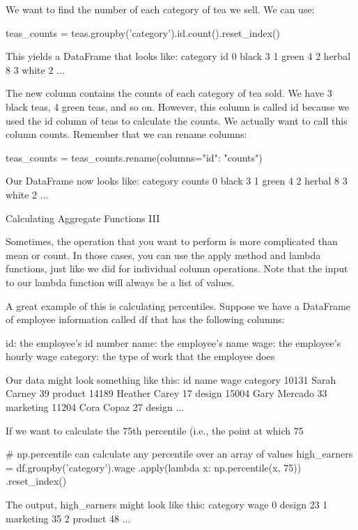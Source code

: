 \documentclass{journal}
\begin{document}
We want to find the number of each category of tea we sell. We can use:

teas_counts = teas.groupby('category').id.count().reset_index()

This yields a DataFrame that looks like:
	category 	id
0 	black 	3
1 	green 	4
2 	herbal 	8
3 	white 	2
... 		
	

The new column contains the counts of each category of tea sold. We have 3 black teas, 4 green teas, and so on. However, this column is called id because we used the id column of teas to calculate the counts. We actually want to call this column counts. Remember that we can rename columns:

teas_counts = teas_counts.rename(columns={"id": "counts"})

Our DataFrame now looks like:
	category 	counts
0 	black 	3
1 	green 	4
2 	herbal 	8
3 	white 	2
... 		
		
		
Calculating Aggregate Functions III

Sometimes, the operation that you want to perform is more complicated than mean or count. In those cases, you can use the apply method and lambda functions, just like we did for individual column operations. Note that the input to our lambda function will always be a list of values.

A great example of this is calculating percentiles. Suppose we have a DataFrame of employee information called df that has the following columns:

    id: the employee's id number
    name: the employee's name
    wage: the employee's hourly wage
    category: the type of work that the employee does

Our data might look something like this:
id 	name 	wage 	category
10131 	Sarah Carney 	39 	product
14189 	Heather Carey 	17 	design
15004 	Gary Mercado 	33 	marketing
11204 	Cora Copaz 	27 	design
... 			

If we want to calculate the 75th percentile (i.e., the point at which 75%

# np.percentile can calculate any percentile over an array of values
high_earners = df.groupby('category').wage
    .apply(lambda x: np.percentile(x, 75))
    .reset_index()

The output, high_earners might look like this:
	category 	wage
0 	design 	23
1 	marketing 	35
2 	product 	48
... 		
\end{document}
